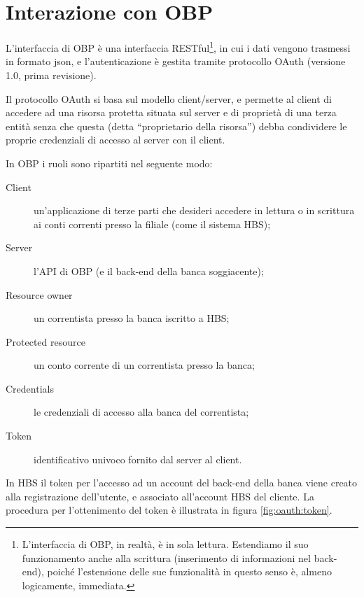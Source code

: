 
\section{Interazione con OBP}

L'interfaccia di OBP è una interfaccia RESTful\footnote{L'interfaccia di OBP, in realtà, è in sola lettura. Estendiamo il suo funzionamento anche alla scrittura (inserimento di informazioni nel back-end), poiché l'estensione delle sue funzionalità in questo senso è, almeno logicamente, immediata.}, in cui i dati vengono trasmessi in formato json, e l'autenticazione è gestita tramite protocollo OAuth\cite{oauthrfc} (versione 1.0, prima revisione).

Il protocollo OAuth si basa sul modello client/server, e permette al client di accedere ad una risorsa protetta situata sul server e di propriet\`a di una terza entit\`a senza che questa (detta ``proprietario della risorsa'') debba condividere le proprie credenziali di accesso al server con il client.

In OBP i ruoli sono ripartiti nel seguente modo:
\begin{description}
	\item[Client] un'applicazione di terze parti che desideri accedere in lettura o in scrittura ai conti correnti presso la filiale (come il sistema HBS);
	\item[Server] l'API di OBP (e il back-end della banca soggiacente);
	\item[Resource owner] un correntista presso la banca iscritto a HBS;
	\item[Protected resource] un conto corrente di un correntista presso la banca;
	\item[Credentials] le credenziali di accesso alla banca del correntista;
	\item[Token] identificativo univoco fornito dal server al client.
\end{description}

In HBS il token per l'accesso ad un account del back-end della banca viene creato alla registrazione dell'utente, e associato all'account HBS del cliente.
La procedura per l'ottenimento del token \`e illustrata in figura \ref{fig:oauth:token}.

